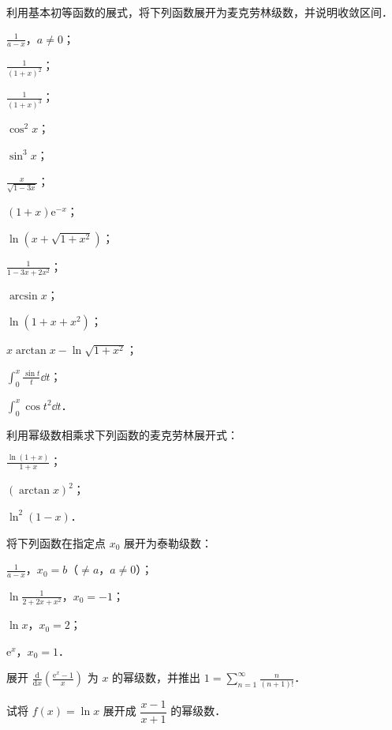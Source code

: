 \begin{xiti}
\item 利用基本初等函数的展式，将下列函数展开为麦克劳林级数，并说明收敛区间．
\begin{ziti}
\item $\displaystyle\frac{1}{a-x}$，$a\neq 0$；
\item $\displaystyle\frac{1}{(1+x)^{2}}$；
\item $\displaystyle\frac{1}{(1+x)^{3}}$；
\item $\cos^{2}x$；
\item $\sin^{3}x$；
\item $\displaystyle\frac{x}{\sqrt{1-3x}}$；
\item $(1+x)\mathrm{e}^{-x}$；
\item $\ln(x+\sqrt{1+x^{2}})$；
\item $\displaystyle\frac{1}{1-3x+2x^{2}}$；
\item $\arcsin x$；
\item $\ln(1+x+x^{2})$；
\item $\displaystyle x\arctan x-\ln\sqrt{1+x^{2}}$；
\item $\displaystyle\int_{0}^{x}\frac{\sin t}{t}\dd t$；
\item $\displaystyle\int_{0}^{x}\cos t^{2}\dd t$．
\end{ziti}
\item 利用幂级数相乘求下列函数的麦克劳林展开式：
\begin{ziti}
\item $\displaystyle\frac{\ln(1+x)}{1+x}$；
\item $(\arctan x)^{2}$；
\item $\ln^{2}(1-x)$．
\end{ziti}
\item 将下列函数在指定点 $x_{0}$ 展开为泰勒级数：
\begin{ziti}
\item $\displaystyle\frac{1}{a-x}$，$x_{0}=b$（$\neq a$，$a\neq 0$）；
\item $\displaystyle\ln\frac{1}{2+2x+x^{2}}$，$x_{0}=-1$；
\item $\ln x$，$x_{0}=2$；
\item $\mathrm{e}^{x}$，$x_{0}=1$．
\end{ziti}
\item 展开 $\displaystyle\frac{\mathrm{d}}{\mathrm{d}x}\left(\frac{\mathrm{e}^{x}-1}{x}\right)$ 为 $x$ 的幂级数，并推出 $\displaystyle 1=\sum_{n=1}^{\infty}\frac{n}{(n+1)!}$．
\item 试将 $f(x)=\ln x$ 展开成 $\dfrac{x-1}{x+1}$ 的幂级数．

\end{xiti}
